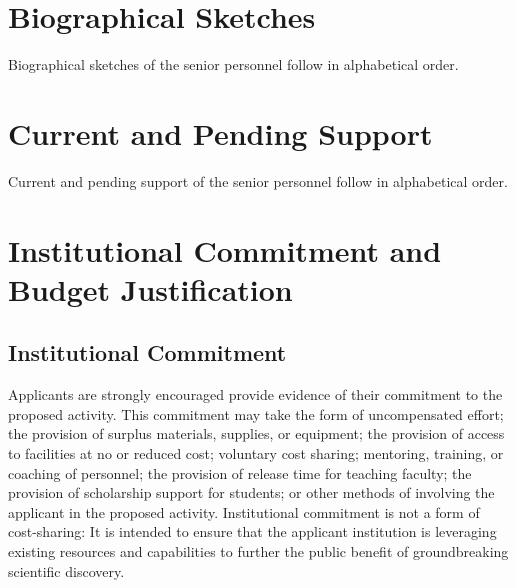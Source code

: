\documentclass[10pt]{article}
\begin{document}
\appendix

\section{Biographical Sketches}

Biographical sketches of the senior personnel follow in alphabetical order.
%
\clearpage

\clearpage
%
\clearpage

\clearpage
%
\clearpage

\clearpage

\clearpage

\clearpage

\clearpage
\section{Current and Pending Support}

Current and pending support of the senior personnel follow in alphabetical order.
%
\clearpage

\clearpage
%
\clearpage

\clearpage
%
\clearpage

\clearpage

\clearpage

\clearpage

\clearpage

\section{Institutional Commitment and Budget Justification}

\subsection{Institutional Commitment} 
Applicants are strongly encouraged provide evidence of their commitment to the proposed activity. This commitment may take the form of uncompensated effort; the provision of surplus materials, supplies, or equipment; the provision of access to facilities at no or reduced cost; voluntary cost sharing; mentoring, training, or coaching of personnel; the provision of release time for teaching faculty; the provision of scholarship support for students; or other methods of involving the applicant in the proposed activity.
Institutional commitment is not a form of cost-sharing: It is intended to ensure that the applicant institution is leveraging existing resources and capabilities to further the public benefit of groundbreaking scientific discovery.
\end{document}
